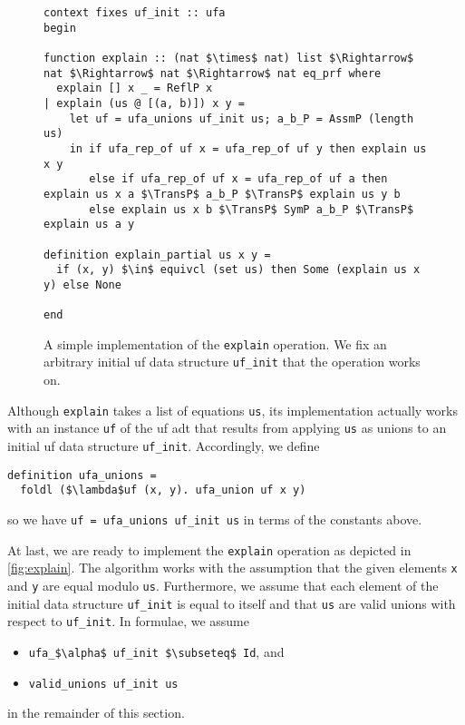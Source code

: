 \documentclass[
  sigplan,
  10pt,
  anonymous,
  review,
  ]{acmart}
\newcommand{\TransP}{\bigtriangledown}
\begin{document}
\begin{figure*}
  \centering
  \begin{lstlisting}
context fixes uf_init :: ufa
begin

function explain :: (nat $\times$ nat) list $\Rightarrow$ nat $\Rightarrow$ nat $\Rightarrow$ nat eq_prf where
  explain [] x _ = ReflP x
| explain (us @ [(a, b)]) x y =
    let uf = ufa_unions uf_init us; a_b_P = AssmP (length us)
    in if ufa_rep_of uf x = ufa_rep_of uf y then explain us x y
       else if ufa_rep_of uf x = ufa_rep_of uf a then explain us x a $\TransP$ a_b_P $\TransP$ explain us y b
       else explain us x b $\TransP$ SymP a_b_P $\TransP$ explain us a y

definition explain_partial us x y =
  if (x, y) $\in$ equivcl (set us) then Some (explain us x y) else None

end
  \end{lstlisting}
  \caption{A simple implementation of the \lstinline|explain| operation. We fix an arbitrary initial \acrshort{uf} data structure \lstinline|uf_init| that the operation works on.\label{fig:explain}}
\end{figure*}
Although \lstinline|explain| takes a list of equations \lstinline|us|, its implementation actually works with an instance \lstinline|uf| of the \acrshort{uf} \acrshort{adt} that results from applying \lstinline|us| as unions to an initial \acrshort{uf} data structure \lstinline|uf_init|.
Accordingly, we define
\begin{lstlisting}
definition ufa_unions =
  foldl ($\lambda$uf (x, y). ufa_union uf x y)
\end{lstlisting}
so we have \lstinline|uf = ufa_unions uf_init us| in terms of the constants above.

At last, we are ready to implement the \lstinline|explain| operation as depicted in \autoref{fig:explain}.
The algorithm works with the assumption that the given elements \lstinline|x| and \lstinline|y| are equal modulo \lstinline|us|.
Furthermore, we assume that each element of the initial data structure \lstinline|uf_init| is equal to itself
and that \lstinline|us| are valid unions with respect to \lstinline|uf_init|.
In formulae, we assume
\begin{itemize}
  \item \lstinline|ufa_$\alpha$ uf_init $\subseteq$ Id|, and
  \item \lstinline|valid_unions uf_init us|
\end{itemize}
in the remainder of this section.
\end{document}
